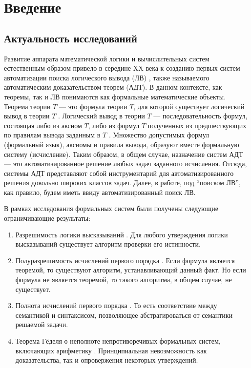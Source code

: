 \chapter*{Введение}

\section*{Актуальность исследований}
Развитие аппарата математической логики и вычислительных систем естественным образом привело в середине XX века к созданию первых систем автоматизации поиска логического вывода (ЛВ) \cite{Newell1, Newell2, WangHao}, также называемого автоматическим доказательством теорем (АДТ). В данном контексте, как теоремы, так и ЛВ понимаются как формальные математические объекты. Теорема теории $T$ --- это формула теории $T$, для которой существует логический вывод в теории $T$ \cite{mendelson}. Логический вывод в теории $T$ --- последовательность формул, состоящая либо из аксиом $T$, либо из формул $T$ полученных из предшествующих по правилам вывода заданным в $T$ \cite{mendelson}. Множество допустимых формул (формальный язык), аксиомы и правила вывода, образуют вместе формальную систему (исчисление). Таким образом, в общем случае, назначение систем АДТ --- это автоматизированное решение любых задач заданного исчисления. Отсюда, системы АДТ представляют собой инструментарий для автоматизированного  решения довольно широких классов задач. Далее, в работе, под ``поиском ЛВ'', как правило, будем иметь ввиду автоматизированный поиск ЛВ.

В рамках исследования формальных систем были получены следующие ограничивающие результаты:
\begin{enumerate}
\item Разрешимость логики высказываний \cite{mendelson}. Для любого утверждения логики высказываний существует алгоритм проверки его истинности.
\item Полуразрешимость исчислений первого порядка \cite{turing}. Если формула является теоремой, то существуют алгоритм, устанавливающий данный факт. Но если формула не является теоремой, то такого алгоритма, в общем случае, не существует.
\item Полнота исчислений первого порядка \cite{Godel1}. То есть соответствие между семантикой и синтаксисом, позволяющее абстрагироваться от семантики решаемой задачи.
\item Теорема Гёделя о неполноте непротиворечивых формальных систем, включающих арифметику \cite{Godel2}. Принципиальная невозможность как доказательства, так и опровержения некоторых утверждений.
\end{enumerate}

